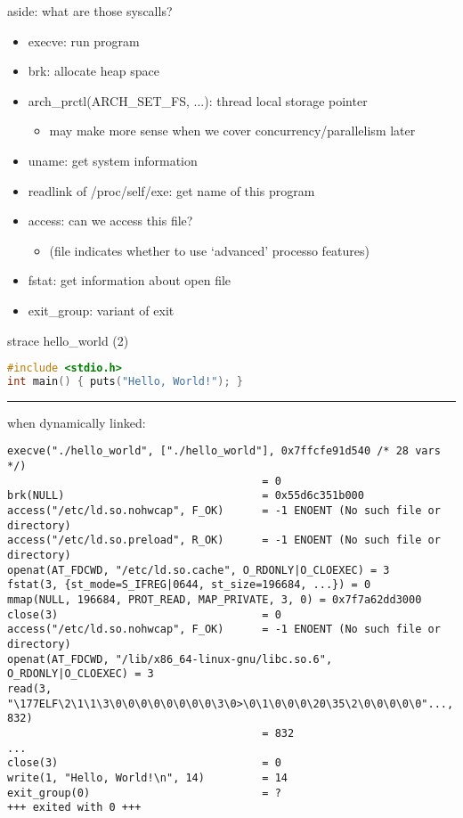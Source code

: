\begin{frame}{aside: what are those syscalls?}
\begin{itemize}
\item execve: run program
\item brk: allocate heap space
\item arch\_prctl(ARCH\_SET\_FS, ...): thread local storage pointer
    \begin{itemize}
    \item may make more sense when we cover concurrency/parallelism later
    \end{itemize}
\item uname: get system information
\item readlink of /proc/self/exe: get name of this program
\item access: can we access this file?
    \begin{itemize}
    \item (file indicates whether to use `advanced' processo features)
    \end{itemize}
\item fstat: get information about open file
\item exit\_group: variant of exit
\end{itemize}
\end{frame}

\begin{frame}[fragile]{strace hello\_world (2)}
\begin{lstlisting}[language=C]
#include <stdio.h>
int main() { puts("Hello, World!"); }
\end{lstlisting}
\hrule
when dynamically linked:
\begin{Verbatim}[fontsize=\fontsize{10}{11}\selectfont]
execve("./hello_world", ["./hello_world"], 0x7ffcfe91d540 /* 28 vars */) 
                                        = 0
brk(NULL)                               = 0x55d6c351b000
access("/etc/ld.so.nohwcap", F_OK)      = -1 ENOENT (No such file or directory)
access("/etc/ld.so.preload", R_OK)      = -1 ENOENT (No such file or directory)
openat(AT_FDCWD, "/etc/ld.so.cache", O_RDONLY|O_CLOEXEC) = 3
fstat(3, {st_mode=S_IFREG|0644, st_size=196684, ...}) = 0
mmap(NULL, 196684, PROT_READ, MAP_PRIVATE, 3, 0) = 0x7f7a62dd3000
close(3)                                = 0
access("/etc/ld.so.nohwcap", F_OK)      = -1 ENOENT (No such file or directory)
openat(AT_FDCWD, "/lib/x86_64-linux-gnu/libc.so.6", O_RDONLY|O_CLOEXEC) = 3
read(3, "\177ELF\2\1\1\3\0\0\0\0\0\0\0\0\3\0>\0\1\0\0\0\20\35\2\0\0\0\0\0"..., 832)
                                        = 832
...
close(3)                                = 0
write(1, "Hello, World!\n", 14)         = 14
exit_group(0)                           = ?
+++ exited with 0 +++
\end{Verbatim}
\end{frame}
